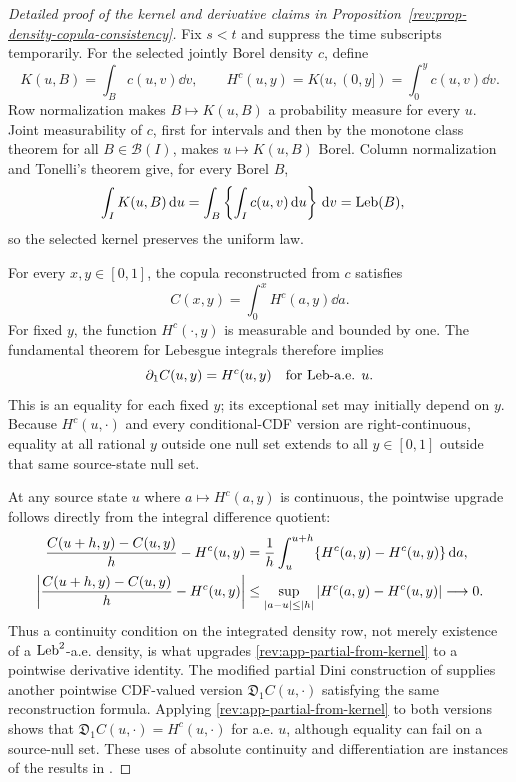 \begin{proof}[Detailed proof of the kernel and derivative claims in
Proposition~\ref{rev:prop-density-copula-consistency}]
Fix $s<t$ and suppress the time subscripts temporarily.  For the selected
jointly Borel density $c$, define
\[
K(u,B)=\int_Bc(u,v)\dd v,
\qquad
H^c(u,y)=K(u,(0,y])=\int_0^yc(u,v)\dd v.
\]
Row normalization makes $B\mapsto K(u,B)$ a probability measure for every
$u$.  Joint measurability of $c$, first for intervals and then by the monotone
class theorem for all $B\in\mathcal B(I)$, makes $u\mapsto K(u,B)$ Borel.
Column normalization and Tonelli's theorem give, for every Borel $B$,
\begin{align}
\int_IK(u,B)\,\mathrm d u
&=\int_B\left\{\int_Ic(u,v)\,\mathrm d u\right\}\,\mathrm d v
=\operatorname{Leb}(B),
\label{rev:app-kernel-invariance}
\end{align}
so the selected kernel preserves the uniform law.

For every $x,y\in[0,1]$, the copula reconstructed from $c$ satisfies
\begin{equation}
C(x,y)=\int_0^xH^c(a,y)\dd a.
\label{rev:app-copula-kernel-reconstruction}
\end{equation}
For fixed $y$, the function $H^c(\cdot,y)$ is measurable and bounded by one.
The fundamental theorem for Lebesgue integrals therefore implies
\begin{equation}
\partial_1C(u,y)=H^c(u,y)
\quad\text{for $\operatorname{Leb}$-a.e. }u.
\label{rev:app-partial-from-kernel}
\end{equation}
This is an equality for each fixed $y$; its exceptional set may initially
depend on $y$.  Because $H^c(u,\cdot)$ and every conditional-CDF version are
right-continuous, equality at all rational $y$ outside one null set extends to
all $y\in[0,1]$ outside that same source-state null set.

At any source state $u$ where $a\mapsto H^c(a,y)$ is continuous, the pointwise
upgrade follows directly from the integral difference quotient:
\begin{align}
\frac{C(u+h,y)-C(u,y)}{h}-H^c(u,y)
&=\frac1h\int_u^{u+h}\{H^c(a,y)-H^c(u,y)\}\,\mathrm d a,\notag\\
\left|\frac{C(u+h,y)-C(u,y)}{h}-H^c(u,y)\right|
&\le \sup_{|a-u|\le |h|}|H^c(a,y)-H^c(u,y)|
\longrightarrow0.
\label{rev:app-pointwise-partial-upgrade}
\end{align}
Thus a continuity condition on the integrated density row, not merely existence
of a $\operatorname{Leb}^2$-a.e. density, is what upgrades
\eqref{rev:app-partial-from-kernel} to a pointwise derivative identity.  The
modified partial Dini construction of \citet{FangJiangLiuYang2020} supplies
another pointwise CDF-valued version $\mathfrak D_1C(u,\cdot)$ satisfying the
same reconstruction formula.  Applying
\eqref{rev:app-partial-from-kernel} to both versions shows that
$\mathfrak D_1C(u,\cdot)=H^c(u,\cdot)$ for a.e. $u$, although equality can fail
on a source-null set.  These uses of absolute continuity and differentiation
are instances of the results in \citet[Chapter~3]{Folland1999}.


\end{proof}
